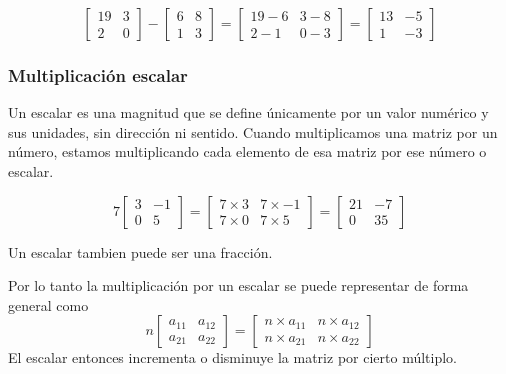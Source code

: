 \begin{ejemplo}
    \[
    \begin{bmatrix}
        19 & 3 \\
        2 & 0 
    \end{bmatrix}
    - 
    \begin{bmatrix}
        6 & 8 \\
        1 & 3 
    \end{bmatrix}
    = 
    \begin{bmatrix}
        19-6 & 3-8 \\
        2-1 & 0-3 
    \end{bmatrix}
    = 
    \begin{bmatrix}
        13 & -5 \\
        1 & -3
    \end{bmatrix}
    \]
\end{ejemplo}

\subsubsection{Multiplicación escalar}

Un escalar es una magnitud que se define únicamente por un valor numérico y sus unidades, sin dirección ni sentido. Cuando multiplicamos una matriz por un número, estamos multiplicando cada elemento de esa matriz por ese número o escalar.
\begin{ejemplo}
    \[
    7\begin{bmatrix}
        3 & -1 \\
        0 & 5
    \end{bmatrix}
    = 
    \begin{bmatrix}
        7\times3 & 7\times-1 \\
        7\times0 & 7\times5
    \end{bmatrix}
    =
    \begin{bmatrix}
        21 & -7 \\
        0 & 35
    \end{bmatrix}
    \]
\end{ejemplo}
Un escalar tambien puede ser una fracción.

Por lo tanto la multiplicación por un escalar se puede representar de forma general como 
\[
n\begin{bmatrix}
    a_{11} & a_{12} \\
    a_{21} & a_{22}
\end{bmatrix}
= 
\begin{bmatrix}
    n\times a_{11} & n\times a_{12} \\
    n\times a_{21} & n\times a_{22}
\end{bmatrix}
\]
El escalar entonces incrementa o disminuye la matriz por cierto múltiplo.

